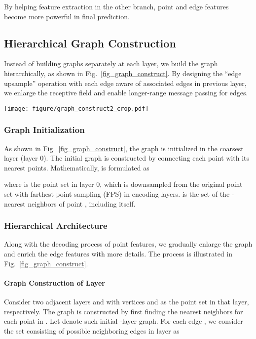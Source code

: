 \documentclass[10pt,twocolumn,letterpaper]{article}
\begin{document}
By helping feature extraction in the other branch, point and edge features become more powerful in final prediction.

\subsection{Hierarchical Graph Construction}
\label{sec_hierarchical_graph}
Instead of building graphs separately at each layer, we build the graph hierarchically, as shown in Fig.~\ref{fig_graph_construct}. By designing the ``edge upsample'' operation with each edge aware of associated edges in previous layer, we enlarge the receptive field and enable longer-range message passing for edges.


\begin{figure*}
	\begin{center}
		\texttt{[image: figure/graph\_construct2\_crop.pdf]}
	\end{center}
	\vspace{-1mm}
	\caption{Hierarchical Graph Construction. The graph is initialized in the coarsest layer and is progressively enlarged by considering both point coordinates in the current layer and the graph in previous layer.}
	\label{fig_graph_construct}
\end{figure*}

\subsubsection{Graph Initialization}
As shown in Fig.~\ref{fig_graph_construct}, the graph is initialized in the coarsest layer (layer 0). 
The initial graph  is constructed by connecting each point with its nearest  points. 
Mathematically,  is formulated as 

where  is the point set in layer 0, which is downsampled from the original point set with farthest point sampling (FPS) in encoding layers.  is the set of the -nearest neighbors of point , including itself.

\subsubsection{Hierarchical Architecture}
Along with the decoding process of point features, we gradually enlarge the graph and enrich the edge features with more details. The process is illustrated in Fig.~\ref{fig_graph_construct}.
\vspace{-0.12in}
\paragraph{Graph Construction of Layer }
Consider two adjacent layers  and  with vertices  and  as the point set in that layer, respectively.
The graph  is constructed by first finding the  nearest neighbors for each point in .
Let  denote such initial -layer graph. For each edge , we consider the set consisting of possible neighboring edges in layer  as
\end{document}
